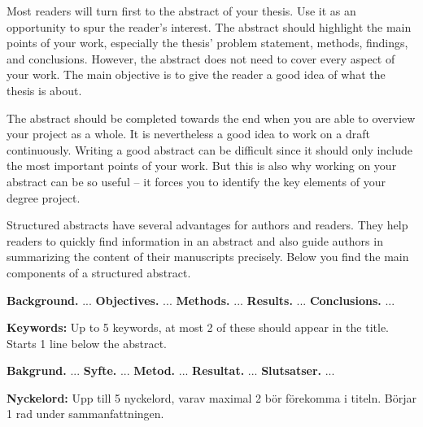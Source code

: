 \documentclass[a4paper,twoside]{bth}
\begin{document}
\abstract
Most readers will turn first to the abstract of your thesis. Use it as an opportunity to spur the reader's interest. The abstract should highlight the main points of your work, especially the thesis' problem statement, methods, findings, and conclusions. However, the abstract does not need to cover every aspect of your work. The main objective is to give the reader a good idea of what the thesis is about.

The abstract should be completed towards the end when you are able to overview your project as a whole. It is nevertheless a good idea to work on a draft continuously. Writing a good abstract can be difficult since it should only include the most important points of your work. But this is also why working on your abstract can be so useful -- it forces you to identify the key elements of your degree project.

Structured abstracts have several advantages for authors and readers. They help readers to quickly find information in an abstract and also guide authors in summarizing the content of their manuscripts precisely. Below you find the main components of a structured abstract.

\noindent
\textbf{Background.} ... \newline
\textbf{Objectives.} ... \newline
\textbf{Methods.} ... \newline
\textbf{Results.} ... \newline
\textbf{Conclusions.} ...

\vspace{1cm}
\noindent
\textbf{Keywords:} Up to 5 keywords, at most 2 of these should appear in the title. Starts 1 line below the abstract.

\cleardoublepage


\sammanfattning
{}
\noindent
\textbf{Bakgrund.} ... \newline
\textbf{Syfte.} ... \newline
\textbf{Metod.} ... \newline
\textbf{Resultat.} ... \newline
\textbf{Slutsatser.} ...

\vspace{1cm}
\noindent
\textbf{Nyckelord:} Upp till 5 nyckelord, varav maximal 2 bör förekomma i titeln. Börjar 1 rad under sammanfattningen.
\end{document}
